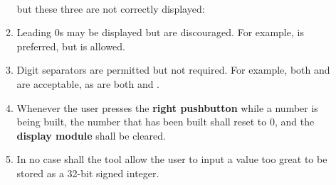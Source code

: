 \begin{enumerate}
\begin{enumerate}
             \hspace{5mm}  \\
            but these three are not correctly displayed: \\
             \hspace{5mm}  \hspace{5mm} 
        \item Leading 0s may be displayed but are discouraged.
            For example,  is preferred, but  is allowed.
        \item Digit separators are permitted but not required.
            For example, both  and  are acceptable, as are both  and .
        \item \label{spec:clearNumber} Whenever the user presses the \textbf{right pushbutton} while a number is being built, the number that has been built shall reset to 0, and the \textbf{display module} shall be cleared.
        \item \label{spec:tooBig} In no case shall the tool allow the user to input a value too great to be stored as a 32-bit signed integer.

\end{enumerate}
\end{enumerate}

